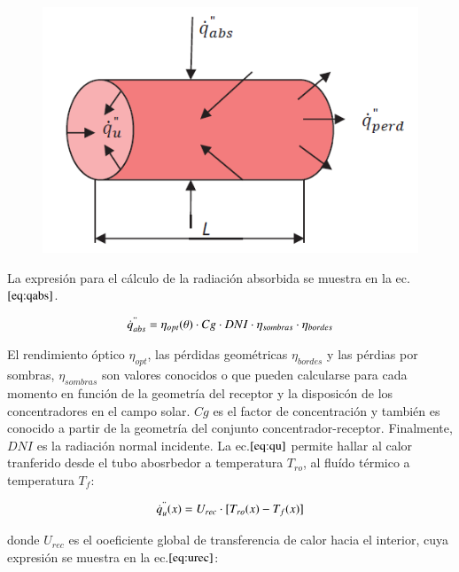 \begin{figure}[H]
	{\includegraphics[scale=0.8]{images/receptor_para_modelo.png}}
	{\label{fig:receptormodelo}}
\end{figure}


La expresión para el cálculo de la radiación absorbida se muestra en la ec.\(\eqref{eq:qabs}\). 

\begin{equation}
    \dot{q}^{"}_{abs}= \eta_{opt}(\theta) \cdot Cg \cdot DNI \cdot \eta_{sombras} \cdot \eta_{bordes} \label{eq:qabs}
\end{equation}

El rendimiento óptico \(\eta_{opt}\), las pérdidas geométricas \(\eta_{bordes}\) y las pérdias por sombras, \(\eta_{sombras}\) son valores conocidos o que pueden calcularse para cada momento en función de la geometría del receptor y la disposicón de los concentradores en el campo solar. \(Cg\) es el factor de concentración y también es conocido a partir de la geometría del conjunto concentrador-receptor. Finalmente, \(DNI\) es la radiación normal incidente. La ec.\(\eqref{eq:qu}\) permite hallar al calor tranferido desde el tubo abosrbedor a temperatura \(T_{ro}\), al fluído térmico a temperatura \(T_{f}\):

\begin{equation}
    \dot{q}^{"}_{u}(x)= U_{rec} \cdot [T_{ro}(x)-T_{f}(x)] \label{eq:qu}
\end{equation}

donde \(U_{rec}\) es el ooeficiente global de transferencia de calor hacia el interior, cuya expresión se muestra en la ec.\(\eqref{eq:urec}\):

